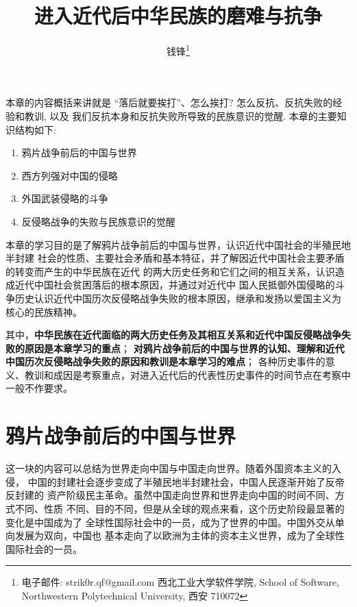 \documentclass[utf-8, 10pt]{article}
\begin{document}

\title{进入近代后中华民族的磨难与抗争}
\author{钱锋\thanks{电子邮件: strik0r.qf@gmail.com
\newline \indent 西北工业大学软件学院, School of Software, Northwestern Polytechnical University, 西安 710072
}}

\maketitle
\thispagestyle{empty}
    

{\small \tableofcontents}

本章的内容概括来讲就是 “落后就要挨打”、怎么挨打? 怎么反抗、反抗失败的经验和教训, 以及
我们反抗本身和反抗失败所导致的民族意识的觉醒. 本章的主要知识结构如下:
\begin{enumerate}[label=1.\arabic*, itemsep=0pt]
    \item 鸦片战争前后的中国与世界
    \item 西方列强对中国的侵略
    \item 外国武装侵略的斗争
    \item 反侵略战争的失败与民族意识的觉醒
\end{enumerate}
本章的学习目的是了解鸦片战争前后的中国与世界，认识近代中国社会的半殖民地半封建
社会的性质、主要社会矛盾和基本特征，并了解因近代中国社会主要矛盾的转变而产生的中华民族在近代
的两大历史任务和它们之间的相互关系，认识造成近代中国社会贫困落后的根本原因，并通过对近代中
国人民抵御外国侵略的斗争历史认识近代中国历次反侵略战争失败的根本原因，继承和发扬以爱国主义为
核心的民族精神。

其中，\textbf{中华民族在近代面临的两大历史任务及其相互关系和近代中国反侵略战争失败的原因是本章学习的重点}；
\textbf{对鸦片战争前后的中国与世界的认知、理解和近代中国历次反侵略战争失败的原因和教训是本章学习的难点}；
各种历史事件的意义、教训和成因是考察重点，对进入近代后的代表性历史事件的时间节点在考察中一般不作要求。

\section{鸦片战争前后的中国与世界}

这一块的内容可以总结为世界走向中国与中国走向世界。随着外国资本主义的入侵，
中国的封建社会逐步变成了半殖民地半封建社会，中国人民逐渐开始了反帝反封建的
资产阶级民主革命。虽然中国走向世界和世界走向中国的时间不同、方式不同、性质
不同、目的不同，但是从全球的观点来看，这个历史阶段最显著的变化是中国成为了
全球性国际社会中的一员，成为了世界的中国。中国外交从单向发展为双向，中国也
基本走向了以欧洲为主体的资本主义世界，成为了全球性国际社会的一员。
\end{document}
